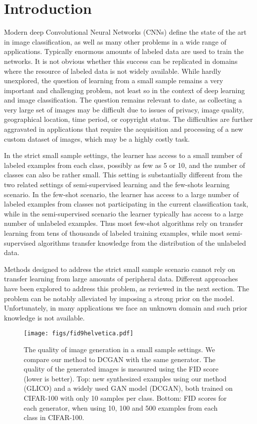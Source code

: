 \documentclass[a4paper,conference]{IEEEtran}
\begin{document}
\section{Introduction}
Modern deep Convolutional Neural Networks (CNNs) define the state of the art in image classification, as well as many other problems in a wide range of applications. Typically enormous amounts of labeled data are used to train the networks. It is not obvious whether this success can be replicated in domains where the resource of labeled data is not widely available. While hardly unexplored, the question of learning from a small sample remains a very important and challenging problem, not least so in the context of deep learning and image classification. The question remains relevant to date, as collecting a very large set of images may be difficult due to issues of privacy, image quality, geographical location, time period, or copyright status. The difficulties are further aggravated in applications that require the acquisition and processing of a new custom dataset of images, which may be a highly costly task. 

In the strict small sample settings, the learner has access to a small number of labeled examples from each class, possibly as few as 5 or 10, and the number of classes can also be rather small. This setting is substantially different from the two related settings of semi-supervised learning and the few-shots learning scenario. In the few-shot scenario, the learner has access to a large number of labeled examples from classes not participating in the current classification task, while in the semi-supervised scenario the learner typically has access to a large number of unlabeled examples. Thus most few-shot algorithms rely on transfer learning from tens of thousands of labeled training examples, while most semi-supervised algorithms transfer knowledge from the distribution of the unlabeled data.  

Methods designed to address the strict small sample scenario cannot rely on transfer learning from large amounts of peripheral data. Different approaches have been explored to address this problem, as reviewed in the next section. The problem can be notably alleviated by imposing a strong prior on the model. Unfortunately, in many applications we face an unknown domain and such prior knowledge is not available. 

\begin{figure}[t]
		\centering
		\texttt{[image: figs/fid9helvetica.pdf]}

\caption{The quality of image generation in a small sample settings. We compare our method to DCGAN with the same generator. The quality of the generated images is measured using the FID score \cite{DBLP:journals/corr/HeuselRUNKH17} (lower is better). Top: new synthesized examples using our method (GLICO) and a widely used GAN model (DCGAN), both trained on CIFAR-100 with only 10 samples per class. Bottom: FID scores for each generator, when using 10, 100 and 500 examples from each class in CIFAR-100.}
	
	\label{fig: fid}
	\vskip -0.2in
\end{figure}
\end{document}
